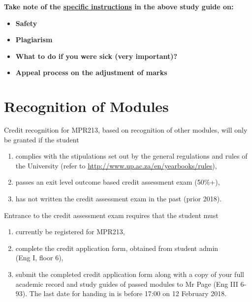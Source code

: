     \noindent
    \textbf{Take note of the \uline{specific instructions} in the above study guide on:}
    \begin{itemize}
        \item \textbf{Safety}
        \item \textbf{Plagiarism}
        \item \textbf{What to do if you were sick (very important)?}
        \item \textbf{Appeal process on the adjustment of marks}
    \end{itemize}

\newpage
\section{Recognition of Modules} \label{sec:credit_study_guide}
    \noindent
    Credit recognition for MPR213, based on recognition of other modules, will
    only be granted if the student
    \begin{enumerate}
        \item complies with the stipulations set out by the general regulations
            and rules of the University (refer to
            \url{http://www.up.ac.za/en/yearbooks/rules}),
        \item passes an exit level outcome based credit assessment exam (50\%+),
        \item has not written the credit assessment exam in the past (prior 2018).
    \end{enumerate}

    \noindent
    Entrance to the credit assessment exam requires that the student must
    \begin{enumerate}
        \item currently be registered for MPR213,
        \item complete the credit application form, obtained from student
            admin \\ (Eng I, floor 6),
        \item submit the completed credit application form along with a copy of
            your full academic record and study guides of passed modules to Mr
            Page (Eng III 6-93). The last date for handing in is before 17:00
            on 12 February 2018.
    \end{enumerate}

